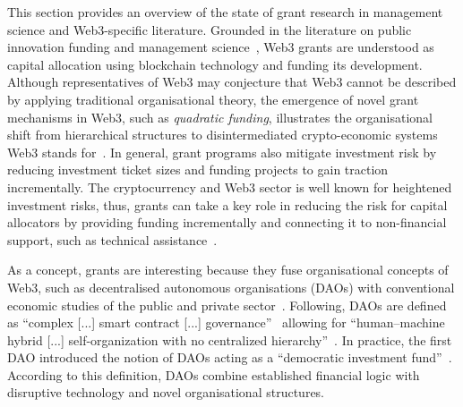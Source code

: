 \documentclass[conference]{IEEEtran}
\begin{document}
This section provides an overview of the state of grant research in management science and Web3-specific literature. Grounded in the literature on public innovation funding and management science~\cite{albors_impact_2011,bartle_review_2003}, Web3 grants are understood as capital allocation using blockchain technology and funding its development. Although representatives of Web3 may conjecture that Web3 cannot be described by applying traditional organisational theory, the emergence of novel grant mechanisms in Web3, such as \textit{quadratic funding}, illustrates the organisational shift from hierarchical structures to disintermediated crypto-economic systems Web3 stands for~\cite[p.~501]{shermin_disrupting_2017}. In general, grant programs also mitigate investment risk by reducing investment ticket sizes and funding projects to gain traction incrementally. The cryptocurrency and Web3 sector is well known for heightened investment risks, thus, grants can take a key role in reducing the risk for capital allocators by providing funding incrementally and connecting it to non-financial support, such as technical assistance~\cite[p.~6]{gilbert_sustainable_2019}.

As a concept, grants are interesting because they fuse organisational concepts of Web3, such as decentralised autonomous organisations (DAOs) with conventional economic studies of the public and private sector~\cite{ding_desci_2022,monteiro_decentralised_2023,wang_self-sovereign_2020}. Following, DAOs are defined as “complex [...] smart contract [...] governance”~\cite[p.~501]{shermin_disrupting_2017} allowing for “human–machine hybrid [...] self-organization with no centralized hierarchy”~\cite[p.~1564]{ding_desci_2022}. In practice, the first DAO introduced the notion of DAOs acting as a “democratic investment fund”~\cite[p.~4]{santos_dao_2018}. According to this definition, DAOs combine established financial logic with disruptive technology and novel organisational structures. 
\end{document}
